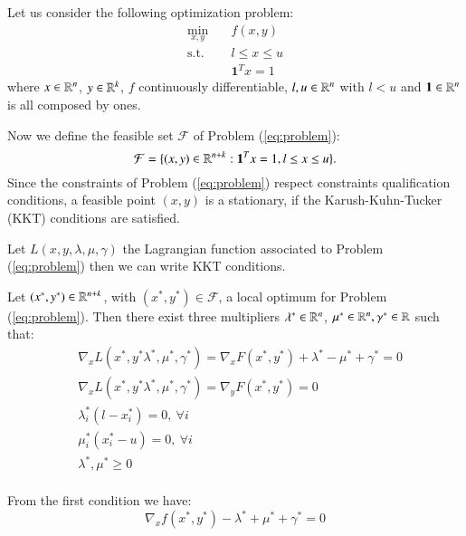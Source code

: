Let us consider the following optimization problem:
\begin{subequations}\label{eq:problem} 
\begin{align}
\min_{x,y} & \quad f(x,y)  \\
\text{s.t.} & \quad l \leq x \leq u \\
& \quad \mathbf{1}^T x = 1 
\end{align}
\end{subequations}
where $x \in \mathbb{R}^n$, $y \in \mathbb{R}^k$, $f$ continuously differentiable, $l, u \in \mathbb{R}^n$ with $l < u$ and $\mathbf{1} \in \mathbb{R}^n$ is all composed by ones. 

Now we define the feasible set $\mathcal{F}$  of Problem (\ref{eq:problem}):
\begin{equation}
\mathcal{F} = \{(x,y) \in \mathbb{R}^{n+k} : \mathbf{1}^T x = 1, l \leq x \leq u\}.
\end{equation}
Since the constraints of Problem (\ref{eq:problem}) respect constraints qualification conditions, a feasible point $(x,y)$ is a stationary, if the Karush-Kuhn-Tucker (KKT) conditions are satisfied.

Let $L(x,y,\lambda,\mu,\gamma)$ the Lagrangian function associated to Problem (\ref{eq:problem}) then we can write KKT conditions.

\begin{proposition}\label{prop:KKT}

Let $(x^*,y^*) \in \mathbb{R}^{n+k}$, with $(x^*,y^*) \in \mathcal{F}$, a local optimum for Problem (\ref{eq:problem}). Then there exist three multipliers $\lambda^* \in \mathbb{R}^n$, $\mu^* \in \mathbb{R}^n, \gamma^* \in \mathbb{R}$ such that:
\begin{equation}
 \begin{aligned}
  &\nabla_x L(x^*,y^*\lambda^*,\mu^*,\gamma^*)= \nabla_x F(x^*,y^*)+\lambda^*-\mu^*+\gamma^*=0\\
 &\nabla_x L(x^*,y^*\lambda^*,\mu^*,\gamma^*)=\nabla_y F(x^*,y^*) =0 \\
    &\lambda^*_i(l-x_i^*)=0,\ \forall i\\
 &\mu^*_i(x_i^*-u)=0,\ \forall i\\
   & \lambda^*,\mu^*\ge0 \\
 \end{aligned}
\end{equation}
\end{proposition}

From the first condition we have:
\begin{equation}
 \nabla_x f(x^*,y^*)-\lambda^*+\mu^*+\gamma^*=0
\end{equation}

